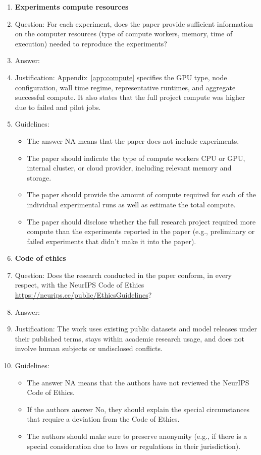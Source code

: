 \documentclass{article}
\begin{document}
\begin{enumerate}
\item {\bf Experiments compute resources}
    \item[] Question: For each experiment, does the paper provide sufficient information on the computer resources (type of compute workers, memory, time of execution) needed to reproduce the experiments?
    \item[] Answer: \answerYes{}
    \item[] Justification: Appendix~\ref{app:compute} specifies the GPU type, node configuration, wall time regime, representative runtimes, and aggregate successful compute. It also states that the full project compute was higher due to failed and pilot jobs.
    \item[] Guidelines:
    \begin{itemize}
        \item The answer NA means that the paper does not include experiments.
        \item The paper should indicate the type of compute workers CPU or GPU, internal cluster, or cloud provider, including relevant memory and storage.
        \item The paper should provide the amount of compute required for each of the individual experimental runs as well as estimate the total compute. 
        \item The paper should disclose whether the full research project required more compute than the experiments reported in the paper (e.g., preliminary or failed experiments that didn't make it into the paper). 
    \end{itemize}
    
\item {\bf Code of ethics}
    \item[] Question: Does the research conducted in the paper conform, in every respect, with the NeurIPS Code of Ethics \url{https://neurips.cc/public/EthicsGuidelines}?
    \item[] Answer: \answerYes{}
    \item[] Justification: The work uses existing public datasets and model releases under their published terms, stays within academic research usage, and does not involve human subjects or undisclosed conflicts.
    \item[] Guidelines:
    \begin{itemize}
        \item The answer NA means that the authors have not reviewed the NeurIPS Code of Ethics.
        \item If the authors answer No, they should explain the special circumstances that require a deviation from the Code of Ethics.
        \item The authors should make sure to preserve anonymity (e.g., if there is a special consideration due to laws or regulations in their jurisdiction).
    \end{itemize}



\end{enumerate}
\end{document}
